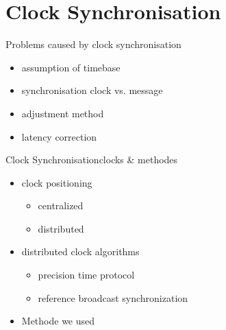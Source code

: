 \documentclass{beamer}
\begin{document}
\section{Clock Synchronisation}
\begin{frame}{Problems caused by clock synchronisation}%
\begin{center}
\begin{itemize}
  \item \begin{large}assumption of timebase\end{large}
 \item \begin{large}synchronisation clock vs. message\end{large}
 \item \begin{large}adjustment method\end{large}
 \item \begin{large}latency correction\end{large}
\end{itemize}
\end{center}
\end{frame}


\begin{frame}{Clock Synchronisation}{clocks \& methodes}
  \begin{center}
  \begin{itemize}
    \item \begin{large}clock positioning\end{large}
    \begin{itemize}
      \item centralized
      \item distributed
    \end{itemize}
    \item \begin{large}distributed clock algorithms\end{large}
    \begin{itemize}
      \item precision time protocol
      \item reference broadcast synchronization
    \end{itemize}
  \item \begin{large}Methode we used\end{large}
  \end{itemize}
  \end{center}
\end{frame}
\end{document}
